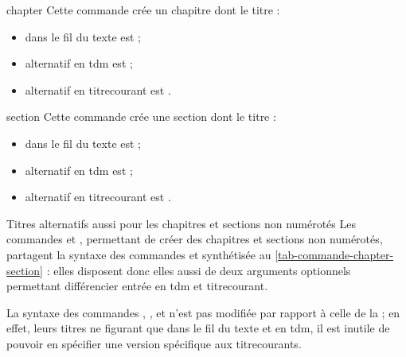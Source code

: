 \begin{docCommand}{chapter}{}
  Cette commande crée un chapitre dont le titre :
  \begin{itemize}
  \item dans le fil du texte est  ;
  \item alternatif en \gls{tdm} est \signet{} ;
  \item alternatif en \gls{titrecourant} est .
  \end{itemize}
\end{docCommand}
%
\begin{docCommand}{section}{}
  Cette commande crée une section dont le titre :
  \begin{itemize}
  \item dans le fil du texte est  ;
  \item alternatif en \gls{tdm} est \signet{} ;
  \item alternatif en \gls{titrecourant} est .
  \end{itemize}
\end{docCommand}
%
\begin{dbremark}{Titres alternatifs aussi pour les chapitres et sections non
    numérotés}{}
  Les commandes  et , permettant
  de créer des chapitres et sections non numérotés, partagent la syntaxe des
  commandes  et  synthétisée au
  \vref{tab-commande-chapter-section} : elles disposent donc elles aussi de deux
  arguments optionnels permettant différencier entrée en \gls{tdm} et
  \gls{titrecourant}.
\end{dbremark}
%
\begin{table}[htb]
  \centering
  \caption{Usage des (deux arguments optionnels des) commandes
    \protect{} et \protect{} (identique pour les
    commandes  et )}
  \label{tab-commande-chapter-section}
  
\end{table}

La syntaxe des commandes ,
,  et
 n'est pas modifiée par rapport à celle de la
 ; en effet, leurs titres ne figurant que dans le fil du texte et en
\gls{tdm}, il est inutile de pouvoir en spécifier une version spécifique aux
\glspl{titrecourant}.
%
